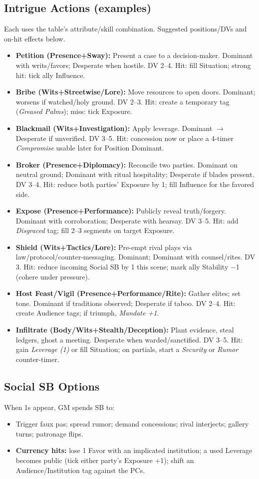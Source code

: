 \documentclass[11pt]{article}
\begin{document}
\subsection{Intrigue Actions (examples)}
Each uses the table's attribute/skill combination. Suggested positions/DVs and on-hit effects below.
\begin{itemize}
  \item \textbf{Petition (Presence+Sway):} Present a case to a decision-maker. Dominant with writs/favors; Desperate when hostile. DV 2--4. Hit: fill Situation; strong hit: tick ally Influence.
  \item \textbf{Bribe (Wits+Streetwise/Lore):} Move resources to open doors. Dominant; worsens if watched/holy ground. DV 2--3. Hit: create a temporary tag (\emph{Greased Palms}); miss: tick Exposure.
  \item \textbf{Blackmail (Wits+Investigation):} Apply leverage. Dominant $\to$ Desperate if unverified. DV 3--5. Hit: concession now or place a 4-timer \emph{Compromise} usable later for Position Dominant.
  \item \textbf{Broker (Presence+Diplomacy):} Reconcile two parties. Dominant on neutral ground; Dominant with ritual hospitality; Desperate if blades present. DV 3--4. Hit: reduce both parties' Exposure by 1; fill Influence for the favored side.
  \item \textbf{Expose (Presence+Performance):} Publicly reveal truth/forgery. Dominant with corroboration; Desperate with hearsay. DV 3--5. Hit: add \emph{Disgraced} tag; fill 2--3 segments on target Exposure.
  \item \textbf{Shield (Wits+Tactics/Lore):} Pre-empt rival plays via law/protocol/counter-messaging. Dominant; Dominant with counsel/rites. DV 3. Hit: reduce incoming Social SB by 1 this scene; mark ally Stability $-$1 (cohere under pressure).
  \item \textbf{Host Feast/Vigil (Presence+Performance/Rite):} Gather elites; set tone. Dominant if traditions observed; Desperate if taboo. DV 2--4. Hit: create Audience tags; if triumph, \emph{Mandate +1}.
  \item \textbf{Infiltrate (Body/Wits+Stealth/Deception):} Plant evidence, steal ledgers, ghost a meeting. Desperate when warded/sanctified. DV 3--5. Hit: gain \emph{Leverage (1)} or fill Situation; on partials, start a \emph{Security} or \emph{Rumor} counter-timer.
\end{itemize}

\subsection{Social SB Options}
When 1s appear, GM spends SB to:
\begin{itemize}
  \item Trigger faux pas; spread rumor; demand concessions; rival interjects; gallery turns; patronage flips.
  \item \textbf{Currency hits:} lose 1 Favor with an implicated institution; a used Leverage becomes public (tick either party's Exposure +1); shift an Audience/Institution tag against the PCs.
\end{itemize}
\end{document}
